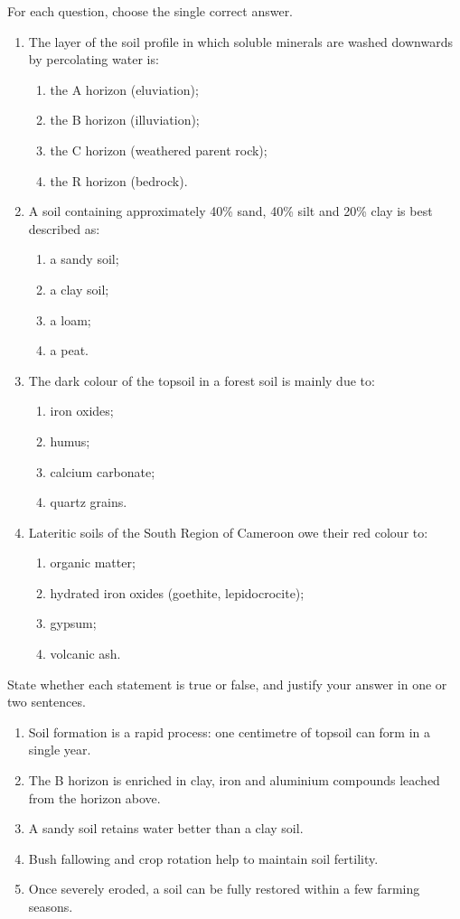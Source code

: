 \documentclass[11pt]{article}
\begin{document}
\begin{exercice}
For each question, choose the single correct answer.
\begin{enumerate}
\item The layer of the soil profile in which soluble minerals are washed downwards by percolating water is:
\begin{enumerate}
\item the A horizon (eluviation);
\item the B horizon (illuviation);
\item the C horizon (weathered parent rock);
\item the R horizon (bedrock).
\end{enumerate}
\item A soil containing approximately 40\% sand, 40\% silt and 20\% clay is best described as:
\begin{enumerate}
\item a sandy soil;
\item a clay soil;
\item a loam;
\item a peat.
\end{enumerate}
\item The dark colour of the topsoil in a forest soil is mainly due to:
\begin{enumerate}
\item iron oxides;
\item humus;
\item calcium carbonate;
\item quartz grains.
\end{enumerate}
\item Lateritic soils of the South Region of Cameroon owe their red colour to:
\begin{enumerate}
\item organic matter;
\item hydrated iron oxides (goethite, lepidocrocite);
\item gypsum;
\item volcanic ash.
\end{enumerate}
\end{enumerate}
\end{exercice}

\begin{exercice}
State whether each statement is true or false, and justify your answer in one or two sentences.
\begin{enumerate}
\item Soil formation is a rapid process: one centimetre of topsoil can form in a single year.
\item The B horizon is enriched in clay, iron and aluminium compounds leached from the horizon above.
\item A sandy soil retains water better than a clay soil.
\item Bush fallowing and crop rotation help to maintain soil fertility.
\item Once severely eroded, a soil can be fully restored within a few farming seasons.
\end{enumerate}
\end{exercice}
\end{document}

